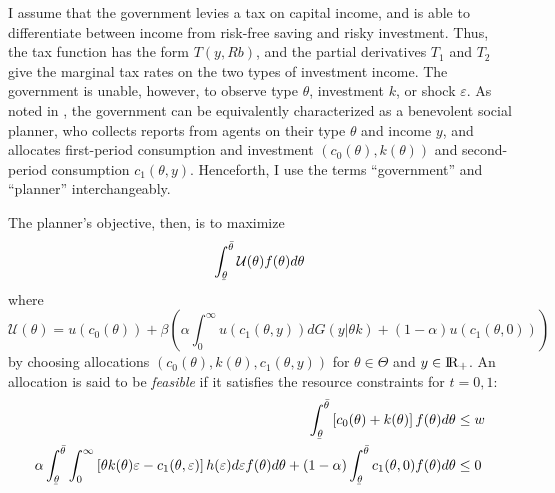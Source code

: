 \documentclass[11pt]{article}
\newcommand{\ubar}[1]{\underaccent{\bar}{#1}}
\newcommand{\R}{{\rm I\!R}}
\newcommand{\U}{\mathcal{U}}
\begin{document}
I assume that the government levies a tax on capital income, and is able to differentiate between income from risk-free saving and risky investment. Thus, the tax function has the form \( T(y,Rb) \), and the partial derivatives \( T_1 \) and \( T_2 \) give the marginal tax rates on the two types of investment income. The government is unable, however, to observe type \( \theta \), investment \( k \), or shock \( \varepsilon \). As noted in \cite{mirrlees1971exploration}, the government can be equivalently characterized as a benevolent social planner, who collects reports from agents on their type \( \theta \) and income \( y \), and allocates first-period consumption and investment \( \left( c_0(\theta),k(\theta) \right) \) and second-period consumption \( c_1(\theta,y) \). Henceforth, I use the terms ``government'' and ``planner'' interchangeably. 


The planner's objective, then, is to maximize
\begin{equation}
    \int_{\ubar{\theta}}^{\bar{\theta}}\U(\theta)f(\theta)d\theta
\end{equation}
where 
\begin{equation}
    \U(\theta) = u\left( c_0(\theta) \right) + \beta\left( \alpha\int_{0}^{\infty}u\left( c_1(\theta,y) \right)dG(y|\theta k) + (1 - \alpha)u\left( c_1(\theta,0) \right)\right)
\end{equation}
by choosing allocations \( \left( c_0(\theta),k(\theta) ,c_1(\theta,y) \right)\) for \( \theta\in\Theta \) and \( y\in\R_+ \). An allocation is said to be \textit{feasible} if it satisfies the resource constraints for \( t=0,1 \):
\begin{align}
    \int_{\ubar{\theta}}^{\bar{\theta}} \left[ c_0(\theta) + k(\theta) \right]f(\theta)d\theta &\le w \\
    \alpha\int_{\ubar{\theta}}^{\bar{\theta}}\int_{0}^{\infty}\left[ \theta k(\theta)\varepsilon - c_1(\theta,\varepsilon) \right]h(\varepsilon)d\varepsilon f(\theta)d\theta + (1-\alpha)\int_{\ubar{\theta}}^{\bar{\theta}}c_1(\theta,0)f(\theta)d\theta &\le 0
\end{align}
\end{document}
